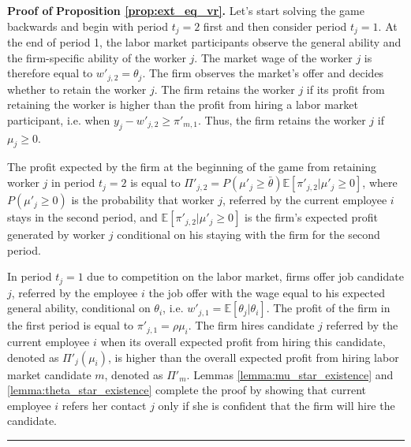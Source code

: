 \documentclass[12pt]{article}
\newenvironment{proof}[1][Proof of]{\noindent\textbf{#1} }{\ \rule{0.5em}{0.5em}}
\begin{document}
\begin{proof}
    \textbf{Proposition \ref{prop:ext_eq_vr}.}
    Let's start solving the game backwards and begin with period $t_j = 2$ first and then consider period $t_j = 1$. At the end of period 1, the labor market participants observe the general ability and the firm-specific ability of the worker $j$. The market wage of the worker $j$ is therefore equal to $w'_{j,2} = \theta_j$. The firm observes the market's offer and decides whether to retain the worker $j$. The firm retains the worker $j$ if its profit from retaining the worker is higher than the profit from hiring a labor market participant, i.e. when $y_j - w'_{j,2} \geq \pi'_{m,1}$. Thus, the firm retains the worker $j$ if $\mu_j \geq 0$. 
    
    The profit expected by the firm at the beginning of the game from retaining worker $j$ in period $t_j = 2$ is equal to $\Pi'_{j,2} = P(\mu'_j \geq \bar{\theta})\mathbb{E}[\pi'_{j,2}|\mu'_j \geq 0]$, where $P(\mu'_j \geq 0)$ is the probability that worker $j$, referred by the current employee $i$ stays in the second period, and $\mathbb{E}[\pi'_{j,2}|\mu'_j \geq 0]$ is the firm's expected profit generated by worker $j$ conditional on his staying with the firm for the second period.  
    
    In period $t_j = 1$ due to competition on the labor market, firms offer job candidate $j$, referred by the employee $i$ the job offer with the wage equal to his expected general ability, conditional on $\theta_i$, i.e. $w'_{j,1} = \mathbb{E}[\theta_j| \theta_i]$. The profit of the firm in the first period is equal to $\pi'_{j,1} = \rho\mu_i$. The firm hires candidate $j$ referred by the current employee $i$ when its overall expected profit from hiring this candidate, denoted as $\Pi'_j(\mu_i)$, is higher than the overall expected profit from hiring labor market candidate $m$, denoted as $\Pi'_m$. Lemmas \ref{lemma:mu_star_existence} and \ref{lemma:theta_star_existence} complete the proof by showing that current employee $i$ refers her contact $j$ only if she is confident that the firm will hire the candidate.
\end{proof}
\end{document}
